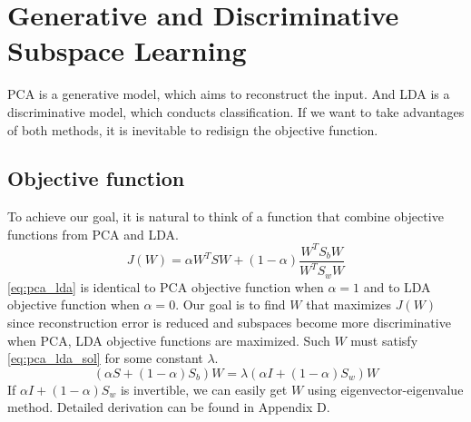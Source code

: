 \section{Generative and Discriminative Subspace Learning}
\label{sec:intro}

PCA is a generative model, which aims to reconstruct the input. And LDA is a discriminative model, which conducts classification. If we want to take advantages of both methods, it is inevitable to redisign the objective function.

\subsection{Objective function}
To achieve our goal, it is natural to think of a function that combine objective functions from PCA and LDA.
\begin{equation}
  J(W) = \alpha W^TSW+(1-\alpha) \frac{W^TS_bW}{W^TS_wW}
  \label{eq:pca_lda}
\end{equation}
\cref{eq:pca_lda} is identical to PCA objective function when $\alpha=1$ and to LDA objective function when $\alpha=0$. Our goal is to find $W$ that maximizes $J(W)$ since reconstruction error is reduced and subspaces become more discriminative when PCA, LDA objective functions are maximized. Such $W$ must satisfy \cref{eq:pca_lda_sol} for some constant $\lambda$.
\begin{equation}
  (\alpha S+(1-\alpha)S_b)W = \lambda (\alpha I + (1-\alpha)S_w)W
  \label{eq:pca_lda_sol}
\end{equation}
If $\alpha I + (1-\alpha)S_w$ is invertible, we can easily get $W$ using eigenvector-eigenvalue method. Detailed derivation can be found in Appendix D.
